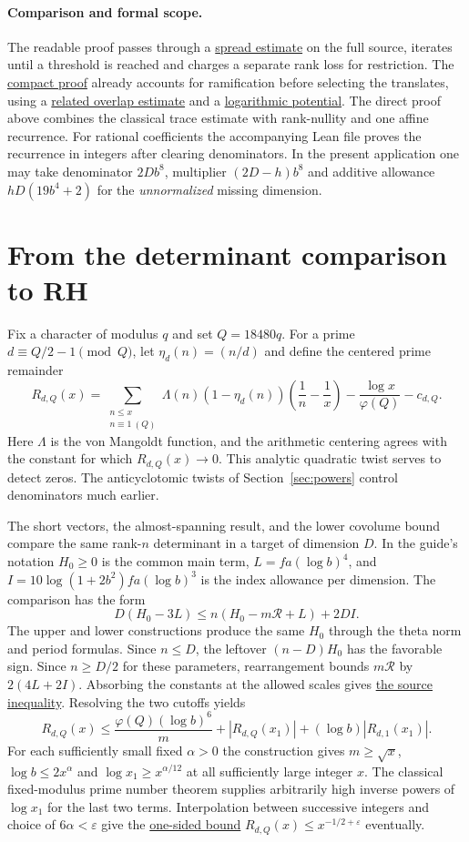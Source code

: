 \documentclass[11pt]{article}
\newcommand{\src}[3]{\href{https://github.com/lsernau/grh-lean/blob/72fead102f663d5c7a407964a13dc0cf9d977207/grh/src/#1.lean\#L#2}{#3}}
\newcommand{\cmp}[3]{\href{https://github.com/lsernau/grh-lean/blob/72fead102f663d5c7a407964a13dc0cf9d977207/grh-compact/src/#1.lean\#L#2}{#3}}
\begin{document}
\paragraph{Comparison and formal scope.} The readable proof passes through a \src{New/Spanning/SecondMoment/FewTranslates}{320}{spread estimate} on the full source, iterates until a threshold is reached and charges a separate rank loss for restriction. The \cmp{New/Filling/FillingTheorem}{25}{compact proof} already accounts for ramification before selecting the translates, using a \cmp{New/Filling/Moments}{301}{related overlap estimate} and a \cmp{New/Heights/OneDeterminant}{97}{logarithmic potential}. The direct proof above combines the classical trace estimate with rank-nullity and one affine recurrence. For rational coefficients the accompanying Lean file proves the recurrence in integers after clearing denominators. In the present application one may take denominator $2Db^8$, multiplier $(2D-h)b^8$ and additive allowance $hD(19b^4+2)$ for the \emph{unnormalized} missing dimension.
\clearpage
\section{From the determinant comparison to RH}\label{sec:end}
Fix a character of modulus $q$ and set $Q=18480q$. For a prime $d\equiv Q/2-1\pmod Q$, let $\eta_d(n)=(n/d)$ and define the centered prime remainder
\[
 R_{d,Q}(x)=\sum_{\substack{n\le x\\n\equiv1\ (Q)}}\!
       \Lambda(n)(1-\eta_d(n))\left(\frac1n-\frac1x\right)
        -\frac{\log x}{\varphi(Q)}-c_{d,Q}.
\]
Here $\Lambda$ is the von Mangoldt function, and the arithmetic centering agrees with the constant for which $R_{d,Q}(x)\to0$. This analytic quadratic twist serves to detect zeros. The anticyclotomic twists of Section~\ref{sec:powers} control denominators much earlier.

The short vectors, the almost-spanning result, and the lower covolume bound compare the same rank-$n$ determinant in a target of dimension $D$. In the guide's notation $H_0\ge0$ is the common main term, $L=fa(\log b)^4$, and $I=10\log(1+2b^2)fa(\log b)^3$ is the index allowance per dimension. The comparison has the form
\[
        D(H_0-3L)\le n(H_0-m\mathcal R+L)+2DI .
\]
The upper and lower constructions produce the same $H_0$ through the theta norm and period formulas. Since $n\le D$, the leftover $(n-D)H_0$ has the favorable sign. Since $n\ge D/2$ for these parameters, rearrangement bounds $m\mathcal R$ by $2(4L+2I)$. Absorbing the constants at the allowed scales gives \src{New/Reduction/MainInequality}{87}{the source inequality}. Resolving the two cutoffs yields
\[
 R_{d,Q}(x)\le\frac{\varphi(Q)(\log b)^6}{m}
        +|R_{d,Q}(x_1)|+(\log b)|R_{d,1}(x_1)|.
\]
For each sufficiently small fixed $\alpha>0$ the construction gives $m\ge\sqrt x$, $\log b\le2x^\alpha$ and $\log x_1\ge x^{\alpha/12}$ at all sufficiently large integer $x$. The classical fixed-modulus prime number theorem supplies arbitrarily high inverse powers of $\log x_1$ for the last two terms. Interpolation between successive integers and choice of $6\alpha<\varepsilon$ give the \src{New/Reduction/OneSidedBound}{200}{one-sided bound} $R_{d,Q}(x)\le x^{-1/2+\varepsilon}$ eventually.
\end{document}
